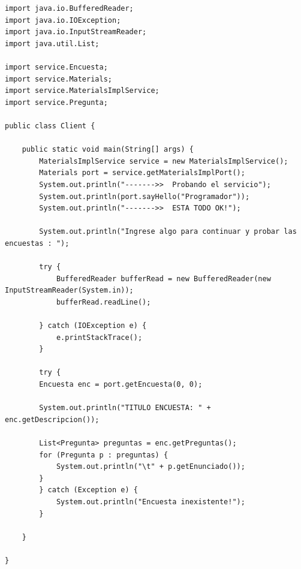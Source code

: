 \documentclass[12pt]{article}
\begin{document}
\begin{itemize}
\begin{verbatim}
import java.io.BufferedReader;
import java.io.IOException;
import java.io.InputStreamReader;
import java.util.List;

import service.Encuesta;
import service.Materials;
import service.MaterialsImplService;
import service.Pregunta;

public class Client {

	public static void main(String[] args) {
		MaterialsImplService service = new MaterialsImplService();
		Materials port = service.getMaterialsImplPort();
		System.out.println("------->>  Probando el servicio");
		System.out.println(port.sayHello("Programador"));
		System.out.println("------->>  ESTA TODO OK!");

		System.out.println("Ingrese algo para continuar y probar las encuestas : ");

		try {
			BufferedReader bufferRead = new BufferedReader(new InputStreamReader(System.in));
			bufferRead.readLine();

		} catch (IOException e) {
			e.printStackTrace();
		}

		try {
		Encuesta enc = port.getEncuesta(0, 0);

		System.out.println("TITULO ENCUESTA: " + enc.getDescripcion());

		List<Pregunta> preguntas = enc.getPreguntas();
		for (Pregunta p : preguntas) {
			System.out.println("\t" + p.getEnunciado());
		}
		} catch (Exception e) {
			System.out.println("Encuesta inexistente!");
		}

	}

}
\end{verbatim}
\end{itemize}

\end{document}
